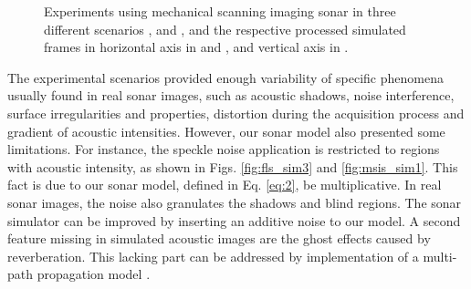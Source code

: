 \documentclass[final,5p,times]{elsarticle}
\begin{document}
\begin{figure}[!ht]
{        \label{fig:msis_sim2}
    }
    \captionsetup{justification=centering}
    \caption{Experiments using mechanical scanning imaging sonar in three
    different scenarios , 
    and , and the respective processed simulated
    frames in horizontal axis in  and
    , and vertical axis in .}
    \label{fig:msis}
\end{figure}

The experimental scenarios provided enough variability of specific phenomena
usually found in real sonar images, such as acoustic shadows, noise
interference, surface irregularities and properties, distortion during
the acquisition process and gradient of acoustic intensities. However, our
sonar model also presented some limitations. For instance, the speckle noise
application is restricted to regions with acoustic intensity, as shown in
Figs. \ref{fig:fls_sim3} and \ref{fig:msis_sim1}. This fact is due to our
sonar model, defined in Eq. \ref{eq:2}, be multiplicative. In real sonar
images, the noise also granulates the shadows and blind regions. The sonar
simulator can be improved by inserting an additive noise to our model.
A second feature missing in simulated acoustic images are the ghost effects
caused by reverberation. This lacking part can be addressed by implementation
of a multi-path propagation model \textcolor{blue}{\cite{huang2015b}}.
\end{document}
